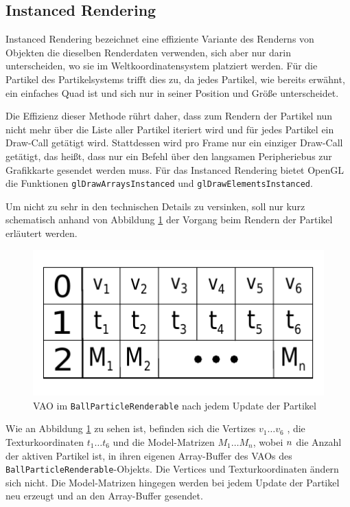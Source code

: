 \subsection{Instanced Rendering}
\label{Kapitel_2_-_Unterkapitel_2.2}
%
Instanced Rendering bezeichnet eine effiziente Variante des Renderns von Objekten die dieselben Renderdaten verwenden, sich aber nur darin unterscheiden, wo sie im Weltkoordinatensystem platziert werden. Für die Partikel des Partikelsystems trifft dies zu, da jedes Partikel, wie bereits erwähnt, ein einfaches Quad ist und sich nur in seiner Position und Größe unterscheidet.

Die Effizienz dieser Methode rührt daher, dass zum Rendern der Partikel nun nicht mehr über die Liste aller Partikel iteriert wird und für jedes Partikel ein Draw-Call getätigt wird. Stattdessen wird pro Frame nur ein einziger Draw-Call getätigt, das heißt, dass nur ein Befehl über den langsamen Peripheriebus zur Grafikkarte gesendet werden muss. Für das Instanced Rendering bietet OpenGL die Funktionen {\texttt{glDrawArraysInstanced}} und {\texttt{glDrawElementsInstanced}}.

Um nicht zu sehr in den technischen Details zu versinken, soll nur kurz schematisch anhand von Abbildung \ref{fig:vao} der Vorgang beim Rendern der Partikel erläutert werden.

\begin{figure}[h]
	\centering
	\includegraphics[scale=0.8]{bilder/vao}
	\caption{VAO im {\texttt{BallParticleRenderable}} nach jedem Update der Partikel}
	\label{fig:vao}
\end{figure}

Wie an Abbildung \ref{fig:vao} zu sehen ist, befinden sich die Vertizes $v_1\dotsc v_6$ , die Texturkoordinaten $t_1\dotsc t_6$ und die Model-Matrizen $M_1\dotsc M_n$, wobei $\mathnormal{n}$ die Anzahl der aktiven Partikel ist, in ihren eigenen Array-Buffer des VAOs des {\texttt{BallParticleRenderable}}-Objekts. Die Vertices und Texturkoordinaten ändern sich nicht. Die Model-Matrizen hingegen werden bei jedem Update der Partikel neu erzeugt und an den Array-Buffer gesendet.

